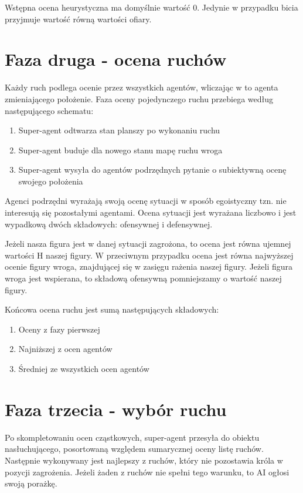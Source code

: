\documentclass[a4paper,12pt,oneside,notitlepage,onecolumn]{article}
\begin{document}
Wstępna ocena heurystyczna ma domyślnie wartość 0.
Jedynie w przypadku bicia przyjmuje wartość równą wartości ofiary.

\section{Faza druga - ocena ruchów}
Każdy ruch podlega ocenie przez wszystkich agentów, wliczając w to agenta zmieniającego położenie.
Faza oceny pojedynczego ruchu przebiega według następującego schematu:
\begin{enumerate}
 \item Super-agent odtwarza stan planszy po wykonaniu ruchu
 \item Super-agent buduje dla nowego stanu mapę ruchu wroga
 \item Super-agent wysyła do agentów podrzędnych pytanie o subiektywną ocenę swojego położenia
\end{enumerate}

Agenci podrzędni wyrażają swoją ocenę sytuacji w sposób egoistyczny tzn. nie interesują się pozostałymi agentami.
Ocena sytuacji jest wyrażana liczbowo i jest wypadkową dwóch składowych: ofensywnej i defensywnej.

Jeżeli nasza figura jest w danej sytuacji zagrożona, to ocena jest równa ujemnej wartości H naszej figury.
W przeciwnym przypadku ocena jest równa najwyższej ocenie figury wroga, znajdującej się w zasięgu rażenia naszej figury.
Jeżeli figura wroga jest wspierana, to składową ofensywną pomniejszamy o wartość naszej figury.

Końcowa ocena ruchu jest sumą następujących składowych:
\begin{enumerate}
 \item Oceny z fazy pierwszej
 \item Najniższej z ocen agentów
 \item Średniej ze wszystkich ocen agentów
\end{enumerate}

\section{Faza trzecia - wybór ruchu}
Po skompletowaniu ocen cząstkowych, super-agent przesyła do obiektu nasłuchującego, posortowaną względem sumarycznej oceny listę ruchów.
Następnie wykonywany jest najlepszy z ruchów, który nie pozostawia króla w pozycji zagrożenia.
Jeżeli żaden z ruchów nie spełni tego warunku, to AI ogłosi swoją porażkę.
\end{document}
